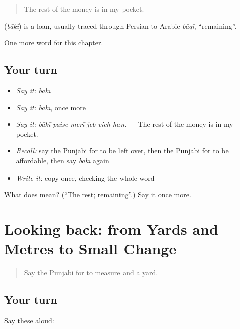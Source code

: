 \begin{quote}
The rest of the money is in my pocket.
\end{quote}

\begin{cousinweb}
\textbf{} (\emph{bākī}) is a loan, usually traced through Persian to Arabic \emph{bāqī}, \textquotedblleft{}remaining\textquotedblright{}.
\end{cousinweb}

\begin{grammarlens}[title={What you've built}]
One more word for this chapter.
\end{grammarlens}

\subsection*{Your turn}
\begin{itemize}
\raggedright
  \item \emph{Say it:} \emph{bākī}
  \item \emph{Say it:} \emph{bākī}, once more
  \item \emph{Say it:} \emph{bākī paise merī jeb vich han.} — The rest of the money is in my pocket.
  \item \emph{Recall:} say the Punjabi for to be left over, then the Punjabi for to be affordable, then say \emph{bākī} again
  \item \emph{Write it:} copy \textbf{} once, checking the whole word
\end{itemize}

\begin{tcolorbox}[breakable,colback=teal!4,colframe=teal!35!black,title={Before you move on}]
What does  mean? (\textquotedblleft{}The rest; remaining\textquotedblright{}.) Say it once more.
\end{tcolorbox}
\section[(dialogue)]{Looking back: from Yards and Metres to Small Change}

\label{lesson:PA-R280-review-274-280}



\begin{quote}
Say the Punjabi for to measure and a yard.
\end{quote}

\subsection*{Your turn}
Say these aloud:

